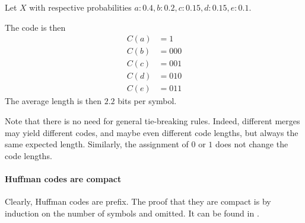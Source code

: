 \begin{example} \label{example:huffman}
Let $X$ with respective probabilities $a: 0.4, b: 0.2, c: 0.15, d:0.15, e:0.1$.


The code is then
\begin{align*}
    C(a) &= 1\\
    C(b) &= 000\\
    C(c) &= 001\\
    C(d) &= 010\\
    C(e) &= 011
\end{align*}
The average length is then $2.2$ bits per symbol.
\end{example}


Note that there is no need for general tie-breaking rules. Indeed, different merges may yield different codes, and maybe even different code lengths, but always the same expected length. Similarly, the assignment of $0$ or $1$ does not change the code lengths.



\paragraph{Huffman codes are compact} Clearly, Huffman codes are prefix. The proof that they are compact is by induction on the number of symbols and omitted. It can be found in \cite[Section 5.8]{CT06}.


